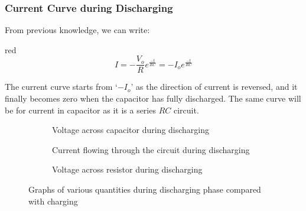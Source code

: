 \subsubsection{Current Curve during Discharging}
From previous knowledge, we can write:
\begin{mybox}{red}{}
  \begin{equation}\label{eq:11.95}
    I  = -\frac{V_{o}}{R}e^{\frac{-t}{RC}} = -I_{o}e^{\frac{-t}{RC}}
  \end{equation}
\end{mybox}
The current curve starts from `$-I_{o}$' as the direction of current
is reversed, and it finally becomes zero when the capacitor has fully discharged.
The same curve will be for current in capacitor as it is a series $RC$ circuit.
\begin{figure}[htbp]
  \centering
  \begin{subfigure}[t]{0.3\textwidth}
      \caption{Voltage across capacitor during discharging}
      \label{fig:11.42a}
  \end{subfigure}
  \begin{subfigure}[t]{0.3\textwidth}
      \caption{Current flowing through the circuit during discharging}
      \label{fig:11.42b}
  \end{subfigure}
  \begin{subfigure}[t]{0.3\textwidth}
    \caption{Voltage across resistor during discharging}
    \label{fig:11.42c}
\end{subfigure}
  \captionsetup{justification = centering}
  \caption[]{Graphs of various quantities during discharging phase compared
  with charging}
  \label{fig:11.42}
\end{figure}
